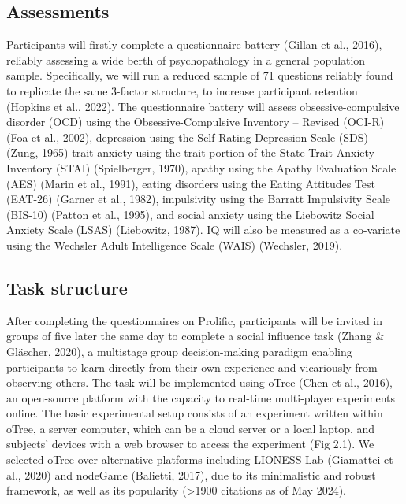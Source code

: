 \documentclass[12pt,a4paper,oneside,]{book} %
\begin{document}
\subsection{Assessments}\label{assessments}

Participants will firstly complete a questionnaire battery (Gillan et al., 2016), reliably assessing a wide berth of psychopathology in a general population sample. Specifically, we will run a reduced sample of 71 questions reliably found to replicate the same 3-factor structure, to increase participant retention (Hopkins et al., 2022). The questionnaire battery will assess obsessive-compulsive disorder (OCD) using the Obsessive-Compulsive Inventory -- Revised (OCI-R) (Foa et al., 2002), depression using the Self-Rating Depression Scale (SDS) (Zung, 1965) trait anxiety using the trait portion of the State-Trait Anxiety Inventory (STAI) (Spielberger, 1970), apathy using the Apathy Evaluation Scale (AES) (Marin et al., 1991), eating disorders using the Eating Attitudes Test (EAT-26) (Garner et al., 1982), impulsivity using the Barratt Impulsivity Scale (BIS-10) (Patton et al., 1995), and social anxiety using the Liebowitz Social Anxiety Scale (LSAS) (Liebowitz, 1987). IQ will also be measured as a co-variate using the Wechsler Adult Intelligence Scale (WAIS) (Wechsler, 2019).

\subsection{Task structure}\label{task-structure}

After completing the questionnaires on Prolific, participants will be invited in groups of five later the same day to complete a social influence task (Zhang \& Gläscher, 2020), a multistage group decision-making paradigm enabling participants to learn directly from their own experience and vicariously from observing others. The task will be implemented using oTree (Chen et al., 2016), an open-source platform with the capacity to real-time multi-player experiments online. The basic experimental setup consists of an experiment written within oTree, a server computer, which can be a cloud server or a local laptop, and subjects' devices with a web browser to access the experiment (Fig 2.1). We selected oTree over alternative platforms including LIONESS Lab (Giamattei et al., 2020) and nodeGame (Balietti, 2017), due to its minimalistic and robust framework, as well as its popularity (\textgreater1900 citations as of May 2024).
\end{document}
